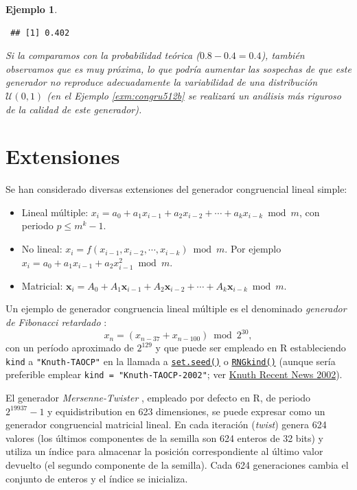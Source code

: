 \documentclass[
  10pt,
]{book}
\renewcommand{\mathbf}[1]{\symbf{#1}}
\theoremstyle{break}
\newtheorem{example}{Ejemplo}[chapter]
\theoremstyle{nonumberplain}
\begin{document}
\begin{example}
\begin{verbatim}
 ## [1] 0.402
\end{verbatim}

Si la comparamos con la probabilidad teórica (\(0.8 - 0.4 = 0.4\)), también observamos que es muy próxima, lo que podría aumentar las sospechas de que este generador no reproduce adecuadamente la variabilidad de una distribución \(\mathcal{U}(0,1)\) (en el Ejemplo \ref{exm:congru512b} se realizará un análisis más riguroso de la calidad de este generador).
\end{example}

\hypertarget{ext-cong}{%
\section{Extensiones}\label{ext-cong}}

Se han considerado diversas extensiones del generador congruencial lineal simple:

\begin{itemize}
\item
  Lineal múltiple:
  \(x_{i}= a_0 + a_1 x_{i-1} + a_2 x_{i-2} + \cdots + a_{k} x_{i-k} \bmod m\),
  con periodo \(p\leq m^{k}-1\).
\item
  No lineal:
  \(x_{i} = f\left( x_{i-1}, x_{i-2}, \cdots, x_{i-k} \right) \bmod m\).
  Por ejemplo \(x_{i} = a_0 + a_1 x_{i-1} + a_2 x_{i-1}^2 \bmod m\).
\item
  Matricial:
  \(\mathbf{x}_{i} = A_0 + A_1 \mathbf{x}_{i-1} + A_2 \mathbf{x}_{i-2} + \cdots + A_{k} \mathbf{x}_{i-k} \bmod m\).
\end{itemize}

Un ejemplo de generador congruencia lineal múltiple es el denominado \emph{generador de Fibonacci retardado} \citep{knuth1969}:
\[x_n = (x_{n-37} + x_{n-100}) \bmod 2^{30},\]
con un período aproximado de \(2^{129}\) y que puede ser empleado en R estableciendo \texttt{kind} a \texttt{"Knuth-TAOCP"} en la llamada a \href{https://rdrr.io/r/base/Random.html}{\texttt{set.seed()}} o \href{https://rdrr.io/r/base/Random.html}{\texttt{RNGkind()}} (aunque sería preferible emplear \texttt{kind\ =\ "Knuth-TAOCP-2002"}; ver \href{https://www-cs-faculty.stanford.edu/~knuth/news02.html\#rng}{Knuth Recent News 2002}).

El generador \emph{Mersenne-Twister} \citep{matsumoto1998}, empleado por defecto en R, de periodo \(2^{19937}-1\) y equidistribution en 623 dimensiones, se puede expresar como un generador congruencial matricial lineal.
En cada iteración (\emph{twist}) genera 624 valores (los últimos componentes de la semilla son 624 enteros de 32 bits) y utiliza un índice para almacenar la posición correspondiente al último valor devuelto (el segundo componente de la semilla).
Cada 624 generaciones cambia el conjunto de enteros y el índice se inicializa.
\end{document}
